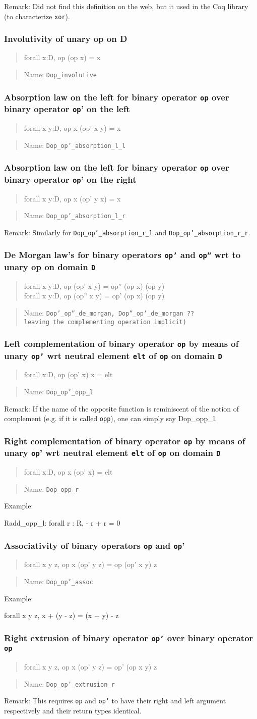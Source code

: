 \documentclass[a4paper]{article}
\newcommand\itemrule[3]{
\subsubsection{#1}
\begin{quote}
\begin{tt}
#3
\end{tt}
\end{quote}
\begin{quote}
Name: \texttt{#2}
\end{quote}}
\newcommand\formula[1]{\begin{tt}#1\end{tt}}
\newcommand\name[1]{\texttt{#1}}
\newcommand\op{\texttt{op}}
\newcommand\opPrime{\texttt{op'}}
\newcommand\opSecond{\texttt{op''}}
\newcommand\D{\texttt{D}}
\newcommand\elt{\texttt{elt}}
\begin{document}
  Remark: Did not find this definition on the web, but it used in
  the Coq library (to characterize \name{xor}).

\itemrule{Involutivity of unary op on D}{Dop\_involutive}
{forall x:D, op (op x) = x}

\itemrule{Absorption law on the left for binary operator {\op} over binary operator {\op}' on the left}{Dop\_op'\_absorption\_l\_l}
{forall x y:D, op x (op' x y) = x}

\itemrule{Absorption law on the left for binary operator {\op} over binary operator {\op}' on the right}{Dop\_op'\_absorption\_l\_r}
{forall x y:D, op x (op' y x) = x}

  Remark: Similarly for \name{Dop\_op'\_absorption\_r\_l} and \name{Dop\_op'\_absorption\_r\_r}.

\itemrule{De Morgan law's for binary operators {\opPrime} and {\opSecond} wrt
to unary op on domain {\D}}{Dop'\_op''\_de\_morgan,
Dop''\_op'\_de\_morgan ?? \mbox{leaving the complementing operation
implicit})}
{forall x y:D, op (op' x y) = op'' (op x) (op y)\\
forall x y:D, op (op'' x y) = op' (op x) (op y)}

\itemrule{Left complementation of binary operator {\op} by means of unary {\opPrime} wrt neutral element {\elt} of {\op} on domain {\D}}{Dop\_op'\_opp\_l}
{forall x:D, op (op' x) x = elt}

Remark: If the name of the opposite function is reminiscent of the
notion of complement (e.g. if it is called \texttt{opp}), one can
simply say {Dop\_opp\_l}.

\itemrule{Right complementation of binary operator {\op} by means of unary {\op'} wrt neutral element {\elt} of {\op} on domain {\D}}{Dop\_opp\_r}
{forall x:D, op x (op' x) = elt}

Example: \formula{Radd\_opp\_l: forall r : R, - r + r = 0}

\itemrule{Associativity of binary operators {\op} and {\op'}}{Dop\_op'\_assoc}
{forall x y z, op x (op' y z) = op (op' x y) z}

Example: \formula{forall x y z, x + (y - z) = (x + y) - z}

\itemrule{Right extrusion of binary operator {\opPrime} over binary operator {\op}}{Dop\_op'\_extrusion\_r}
{forall x y z, op x (op' y z) = op' (op x y) z}

Remark: This requires {\op} and {\opPrime} to have their right and left
argument respectively and their return types identical.
\end{document}

